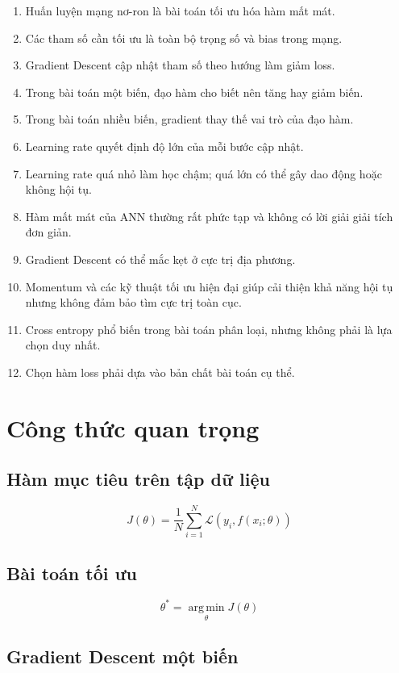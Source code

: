 \documentclass[12pt,a4paper]{report}
\begin{document}
\begin{enumerate}
    \item Huấn luyện mạng nơ-ron là bài toán tối ưu hóa hàm mất mát.
    \item Các tham số cần tối ưu là toàn bộ trọng số và bias trong mạng.
    \item Gradient Descent cập nhật tham số theo hướng làm giảm loss.
    \item Trong bài toán một biến, đạo hàm cho biết nên tăng hay giảm biến.
    \item Trong bài toán nhiều biến, gradient thay thế vai trò của đạo hàm.
    \item Learning rate quyết định độ lớn của mỗi bước cập nhật.
    \item Learning rate quá nhỏ làm học chậm; quá lớn có thể gây dao động hoặc không hội tụ.
    \item Hàm mất mát của ANN thường rất phức tạp và không có lời giải giải tích đơn giản.
    \item Gradient Descent có thể mắc kẹt ở cực trị địa phương.
    \item Momentum và các kỹ thuật tối ưu hiện đại giúp cải thiện khả năng hội tụ nhưng không đảm bảo tìm cực trị toàn cục.
    \item Cross entropy phổ biến trong bài toán phân loại, nhưng không phải là lựa chọn duy nhất.
    \item Chọn hàm loss phải dựa vào bản chất bài toán cụ thể.
\end{enumerate}

\section{Công thức quan trọng}

\subsection*{Hàm mục tiêu trên tập dữ liệu}

\[
    J(\theta)
    =
    \frac{1}{N}
    \sum_{i=1}^{N}
    \mathcal{L}
    \left(
    y_i,
    f(x_i;\theta)
    \right)
\]

\subsection*{Bài toán tối ưu}

\[
    \theta^*
    =
    \operatorname*{arg\,min}_{\theta}J(\theta)
\]

\subsection*{Gradient Descent một biến}
\end{document}
